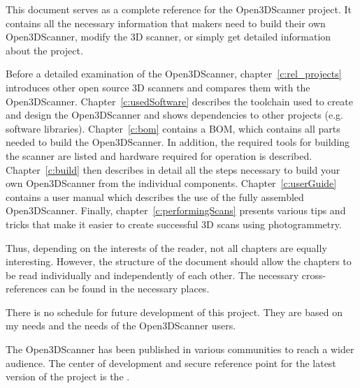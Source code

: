 This document serves as a complete reference for the Open3DScanner project. It contains all the necessary information that makers need to build their own Open3DScanner, modify the 3D scanner, or simply get detailed information about the project.%

Before a detailed examination of the Open3DScanner, chapter~\ref{c:rel_projects} introduces other open source 3D scanners and compares them with the Open3DScanner. Chapter~\ref{c:usedSoftware} describes the toolchain used to create and design the Open3DScanner and shows dependencies to other projects (e.g. software libraries). Chapter~\ref{c:bom} contains a BOM, which contains all parts needed to build the Open3DScanner. In addition, the required tools for building the scanner are listed and hardware required for operation is described. Chapter~\ref{c:build} then describes in detail all the steps necessary to build your own Open3DScanner from the individual components. Chapter~\ref{c:userGuide} contains a user manual which describes the use of the fully assembled Open3DScanner. Finally, chapter~\ref{c:performingScans} presents various tips and tricks that make it easier to create successful 3D scans using photogrammetry.%

Thus, depending on the interests of the reader, not all chapters are equally interesting. However, the structure of the document should allow the chapters to be read individually and independently of each other. The necessary cross-references can be found in the necessary places.%

There is no schedule for future development of this project. They are based on my needs and the needs of the Open3DScanner users.%

The Open3DScanner has been published in various communities to reach a wider audience. The center of development and secure reference point for the latest version of the project is the {\faGithub} .%